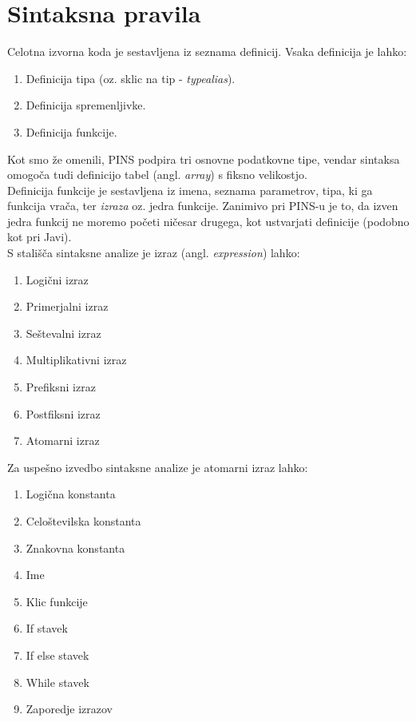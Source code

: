 \documentclass[a4paper, 12p]{book}
\begin{document}
\section{Sintaksna pravila} \label{pinsSyntax}

Celotna izvorna koda je sestavljena iz seznama definicij. Vsaka definicija je lahko:

\begin{enumerate}
	\item Definicija tipa (oz. sklic na tip - \textit{typealias}).
	\item Definicija spremenljivke.
	\item Definicija funkcije.
\end{enumerate}

Kot smo že omenili, PINS podpira tri osnovne podatkovne tipe, vendar sintaksa omogoča tudi definicijo tabel (angl. \textit{array}) s fiksno velikostjo. \\
\indent Definicija funkcije je sestavljena iz imena, seznama parametrov, tipa, ki ga funkcija vrača, ter \textit{izraza} oz. jedra funkcije. Zanimivo pri PINS-u je to, da izven jedra funkcij ne moremo početi ničesar drugega, kot ustvarjati definicije (podobno kot pri Javi). \\
\indent S stališča sintaksne analize je izraz (angl. \textit{expression}) lahko:
\begin{enumerate}
	\item Logični izraz
	\item Primerjalni izraz
	\item Seštevalni izraz
	\item Multiplikativni izraz
	\item Prefiksni izraz
	\item Postfiksni izraz
	\item Atomarni izraz
\end{enumerate}

Za uspešno izvedbo sintaksne analize je atomarni izraz lahko:
\begin{enumerate}
	\item Logična konstanta
	\item Celoštevilska konstanta
	\item Znakovna konstanta
	\item Ime
	\item Klic funkcije
	\item If stavek
	\item If else stavek
	\item While stavek
	\item Zaporedje izrazov
\end{enumerate}
\end{document}
